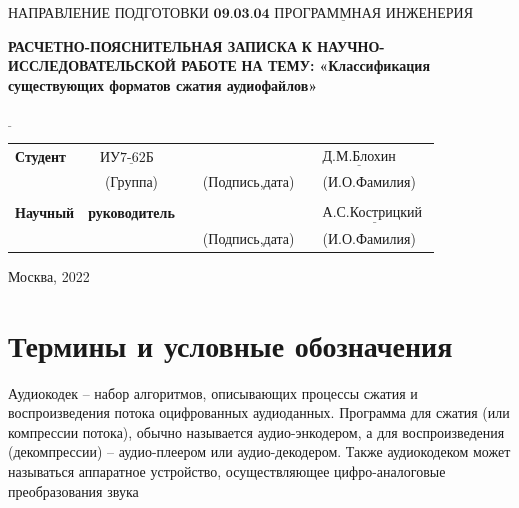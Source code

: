 \documentclass[12pt,a4paper,oneside]{report}
\begin{document}
\noindent НАПРАВЛЕНИЕ ПОДГОТОВКИ $\underline{\textbf{09.03.04 ПРОГРАММНАЯ ИНЖЕНЕРИЯ}}$\newline\newline\newline\newline\newline\newline\newline
\begin{center}
    \begin{flushright}
    \Large\textbf{РАСЧЕТНО-ПОЯСНИТЕЛЬНАЯ ЗАПИСКА}\newline
	\Large\textbf{К НАУЧНО-ИССЛЕДОВАТЕЛЬСКОЙ РАБОТЕ}\newline
	\Large\textbf{НА ТЕМУ:}\newline
	\Large\textbf{«Классификация существующих форматов сжатия аудиофайлов»}\newline
	\end{flushright}
\end{center}
\noindent\textbf{} $\underline{\text{}}$\newline\newline\newline\newline

\begin{tabular}{lcp{5em}lp{2em}l}
	\noindent\textbf{Студент} &  $\underline{\text{ИУ7-62Б~~}}$ &             &\hspace{1cm} & & $\underline{\text{Д.М.Блохин}}$ \\\cline{4-3}
	 & (Группа) & &(Подпись,дата)  & & (И.О.Фамилия) \\
	 & & & & &\\
	\noindent\textbf{Научный} & \textbf{руководитель} &  &\hspace{1cm} & &$\underline{\text{А.С.Кострицкий~}}$ \\\cline{4-3} 
	 &  & & (Подпись,дата)  & &(И.О.Фамилия) \\
    \end{tabular}

\begin{center}
	\vfill
	Москва, 2022
\end{center}
\newpage

\renewcommand*\contentsname{Содержание}
\tableofcontents
\setcounter{page}{1}
\newpage

\chapter*{Термины и условные обозначения}
\quad
Аудиокодек – набор алгоритмов, описывающих процессы сжатия и воспроизведения потока оцифрованных аудиоданных. Программа для сжатия (или компрессии потока), обычно называется аудио-энкодером, а для воспроизведения (декомпрессии) – аудио-плеером или аудио-декодером. Также аудиокодеком может называться аппаратное устройство, осуществляющее цифро-аналоговые преобразования звука
\end{document}
